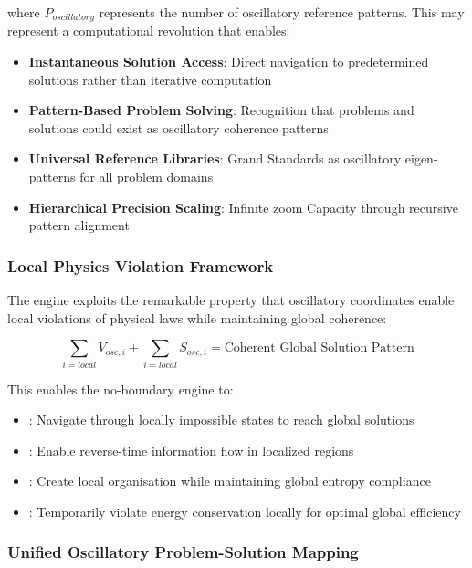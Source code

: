 \documentclass[11pt,a4paper]{article}
\theoremstyle{remark}
\begin{document}
where $P_{oscillatory}$ represents the number of oscillatory reference patterns. This may represent a computational revolution that enables:

\begin{itemize}
\item \textbf{Instantaneous Solution Access}: Direct navigation to predetermined solutions rather than iterative computation
\item \textbf{Pattern-Based Problem Solving}: Recognition that problems and solutions could exist as oscillatory coherence patterns
\item \textbf{Universal Reference Libraries}: Grand Standards as oscillatory eigen-patterns for all problem domains
\item \textbf{Hierarchical Precision Scaling}: Infinite zoom Capacity through recursive pattern alignment
\end{itemize}

\subsubsection{Local Physics Violation Framework}

The engine exploits the remarkable property that oscillatory coordinates enable local violations of physical laws while maintaining global coherence:

\begin{equation}
\sum_{i=local} V_{osc,i} + \sum_{i=local} S_{osc,i} = \text{Coherent Global Solution Pattern}
\end{equation}

This enables the no-boundary engine to:

\begin{itemize}
  \item {}: Navigate through locally impossible states to reach global solutions
  \item {}: Enable reverse-time information flow in localized regions
  \item {}: Create local organisation while maintaining global entropy compliance
  \item {}: Temporarily violate energy conservation locally for optimal global efficiency
\end{itemize}


\subsubsection{Unified Oscillatory Problem-Solution Mapping}
\end{document}

